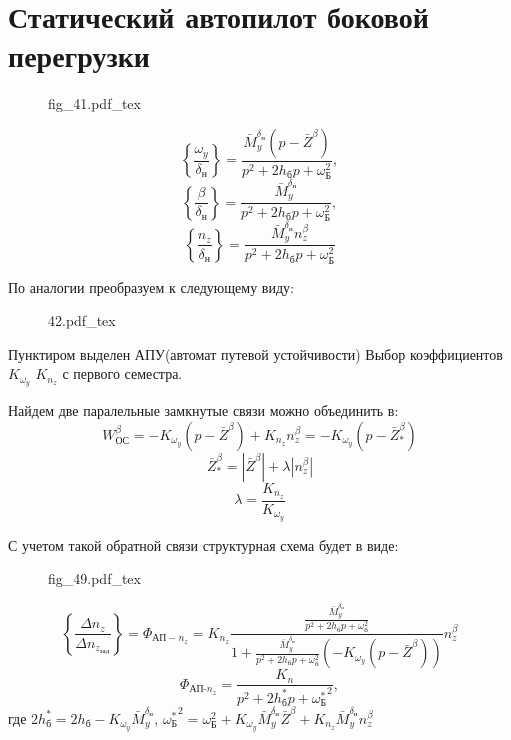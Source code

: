 \documentclass{article}
\newcommand{\incfig}[1]{
    {#1.pdf_tex}
}
\begin{document}
\section{Статический автопилот боковой перегрузки}

\begin{figure}[H]
	\centering
	{fig_41.pdf_tex}
\end{figure}



\[
	\left\{\frac{\omega_y}{\delta_\text{н}}\right\} = \frac{\bar{M}_y^{\delta_\text{н}}(p - \bar{Z}^\beta)}{ p^2 + 2 h_\text{б}p + \omega_\text{Б}^2 },
\]
\[
	\left\{ \frac{\beta}{\delta_\text{н}} \right\} = \frac{ \bar{M}_y^{\delta_\text{н}} }{ p^2 + 2 h_\text{б}p + \omega_\text{Б}^2 }    
	,\]
\[
	\left\{ \frac{n_z}{\delta_\text{н}} \right\} = \frac{ \bar{M}_y^{\delta_\text{н}} n_z^\beta }{ p^2 + 2 h_\text{б}p + \omega_\text{Б}^2 }    
\]

По аналогии преобразуем к следующему виду:

\begin{figure}[H]
	\centering
	{42.pdf_tex}
\end{figure}


Пунктиром выделен АПУ(автомат путевой устойчивости) 
Выбор коэффициентов $K_{\omega_y}$ $K_{n_z}$ с первого семестра.

Найдем две паралельные замкнутые связи можно объединить в: 
\[
	W_\text{ОС}^\beta = - K_{\omega_y} (p - \bar{Z}^\beta) + K_{n_z} n_z^\beta = - K_{\omega_y}(p - \bar{Z}_*^\beta)
\]
\[
	\bar{Z}_*^\beta = |\bar{Z}^\beta| + \lambda |n_z^\beta|
\]
\[
	\lambda = \frac{K_{n_z}}{K_{\omega_y}}
\]

С учетом такой обратной связи структурная схема будет в виде:

\begin{figure}[ht]
	\centering
	\incfig{fig_49}
	\label{fig:fig_49}
\end{figure}

\[
	\left\{\frac{\Delta n_z}{\Delta n_{z_\text{зад}}} \right\}  = \Phi_{\text{АП}-n_z} = K_{n_z}\frac{\frac{\bar{M}_y^{\delta_\text{н}}}{p^2 + 2 h_\text{б} p + \omega_\text{б}^2}}{1 +\frac{\bar{M}_y^{\delta_\text{н}}}{p^2 + 2 h_\text{б} p + \omega_\text{б}^2} (-K_{\omega_y}(p - \bar{Z}^\beta))}n_z^\beta  
\]
\[
	\Phi_{\text{АП-}n_z} =\frac{K_n}{ p^2 + 2 h_\text{б}^*p + {\omega_\text{Б}^*}^2  }, 
\]
где $2h_\text{б}^* = 2h_\text{б} - K_{\omega_y}\bar{M}_y^{\delta_\text{н}}$, ${\omega_\text{Б}^*}^2 = \omega_\text{Б}^2 + K_{\omega_y}\bar{M}_y^{\delta_\text{н}} \bar{Z}^\beta + K_{n_z} \bar{M}_y^{\delta_\text{н}} n_z^\beta $
\end{document}
